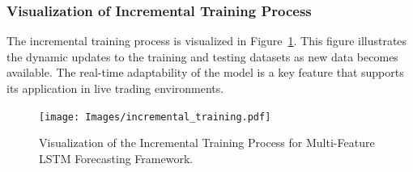\subsubsection{Visualization of Incremental Training Process}
The incremental training process is visualized in Figure~\ref{fig:incremental_training}. This figure illustrates the dynamic updates to the training and testing datasets as new data becomes available. The real-time adaptability of the model is a key feature that supports its application in live trading environments.

\begin{figure}[h!]
    \centering
    \texttt{[image: Images/incremental\_training.pdf]}
    \caption{Visualization of the Incremental Training Process for Multi-Feature LSTM Forecasting Framework.}
    \label{fig:incremental_training}
\end{figure}







